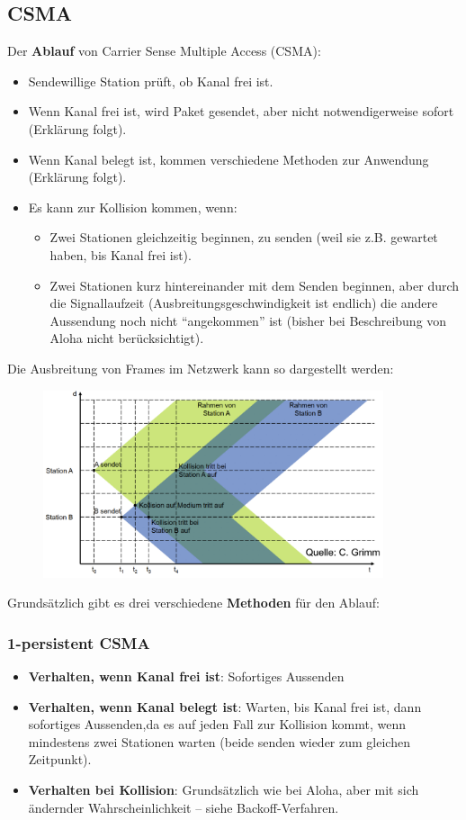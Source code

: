 \documentclass{article} %
\begin{document}
\subsection{CSMA}
Der \textbf{Ablauf} von Carrier Sense Multiple Access (CSMA):
	\begin{itemize}
	\item Sendewillige Station prüft, ob Kanal frei ist. 
	\item Wenn Kanal frei ist, wird Paket gesendet, aber nicht notwendigerweise sofort (Erklärung folgt). 
	\item Wenn Kanal belegt ist, kommen verschiedene Methoden zur Anwendung (Erklärung folgt). 
	\item Es kann zur Kollision kommen, wenn:
		\begin{itemize}
		\item Zwei Stationen gleichzeitig beginnen, zu senden (weil sie z.B. gewartet haben, bis Kanal frei ist). 
		\item Zwei Stationen kurz hintereinander mit dem Senden beginnen, aber durch die Signallaufzeit (Ausbreitungsgeschwindigkeit ist endlich) die andere Aussendung noch nicht "`angekommen"' ist (bisher bei Beschreibung von Aloha nicht berücksichtigt). 
		\end{itemize}
	\end{itemize}
Die Ausbreitung von Frames im Netzwerk kann so dargestellt werden:
	\begin{figure}[ht]
	\centering
	\includegraphics[width=10cm]{img/csma.png}
	\end{figure}
	
	
\noindent Grundsätzlich gibt es drei verschiedene \textbf{Methoden} für den Ablauf:
\subsubsection{1-persistent CSMA}	
	\begin{itemize}
	\item \textbf{Verhalten, wenn Kanal frei ist}: Sofortiges Aussenden
	\item \textbf{Verhalten, wenn Kanal belegt ist}: Warten, bis Kanal frei ist, dann sofortiges Aussenden,da es auf jeden Fall zur Kollision kommt, wenn mindestens zwei Stationen warten (beide senden wieder zum gleichen Zeitpunkt).
	\item \textbf{Verhalten bei Kollision}: Grundsätzlich wie bei Aloha, aber mit sich ändernder Wahrscheinlichkeit – siehe Backoff-Verfahren. 
	\end{itemize}
\end{document}

